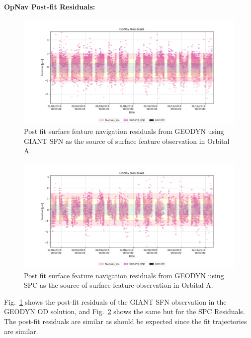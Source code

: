 \documentclass{RPI-SIW}
\begin{document}
\textbf{OpNav Post-fit Residuals:}
\begin{figure}[h]
	\centering
	\includegraphics[width=\columnwidth]{orbita_sfn.png}
    \caption{Post fit surface feature navigation residuals from GEODYN using GIANT SFN as the source of surface feature observation in Orbital A.}
    \label{fig:oasfn}
\end{figure}
\begin{figure}[h]
	\centering
	\includegraphics[width=\columnwidth]{orbita_spc.png}
    \caption{Post fit surface feature navigation residuals from GEODYN using SPC as the source of surface feature observation in Orbital A.}
    \label{fig:oaspc}
\end{figure}
Fig.~\ref{fig:oasfn} shows the post-fit residuals of the GIANT SFN observation in the GEODYN OD solution, and Fig.~\ref{fig:oaspc} shows the same but for the SPC Residuals.  The post-fit residuals are similar as should be expected since the fit trajectories are similar.

% 
% 
% 
\end{document}
